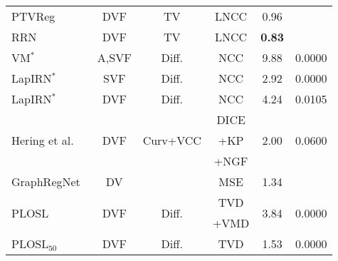 \begin{table}[htp]
\begin{small}
{\begin{tabular}{lccccc}
				PTVReg~\cite{vishnevskiy2017isotropic}                    & DVF                  & TV                                    & LNCC    & 0.96\resTS                  & \textemdash             \\
				RRN~\cite{he2021recursive}                                & DVF                  & TV                                    & LNCC    & \textbf{0.83}\resTS         & \textemdash             \\
				\midrule
				VM$^\ast$~\cite{balakrishnan2019voxelmorph}               & A,SVF                & Diff.                                 & NCC     & 9.88\resTS                  & 0.0000                  \\
				LapIRN$^\ast$~\cite{mok2020large}                         & SVF                  & Diff.                                 & NCC     & 2.92\resTS                  & 0.0000                  \\
				LapIRN$^\ast$~\cite{mok2020large}                         & DVF                  & Diff.                                 & NCC     & 4.24\resTS                  & 0.0105                  \\
				\multirow{3}{*}{Hering et al. ~\cite{hering2021cnn}}      & \multirow{3}{*}{DVF} & \multirow{3}{*}{Curv+VCC}             & DICE    & \multirow{3}{*}{2.00\resTS} & \multirow{3}{*}{0.0600} \\
				                                                          &                      &                                       & +KP     &                             &                         \\
				                                                          &                      &                                       & +NGF    &                             &                         \\
				GraphRegNet~\cite{hansen2021graphregnet}                  & DV                   & \textemdash                           & MSE     & 1.34\resTS                  & \textemdash             \\
				\multirow{2}{*}{PLOSL~\cite{wang2022PLOSL}}               & \multirow{2}{*}{DVF} & \multirow{2}{*}{Diff.}                & TVD     & \multirow{2}{*}{3.84\resTS} & \multirow{2}{*}{0.0000} \\
				                                                          &                      &                                       & +VMD    &                             &                         \\
				\multirow{2}{*}{$\text{PLOSL}_{50}$~\cite{wang2022PLOSL}} & \multirow{2}{*}{DVF} & \multirow{2}{*}{Diff.}                & TVD     & \multirow{2}{*}{1.53\resTS} & \multirow{2}{*}{0.0000} \\

\end{tabular}}
\end{small}
\end{table}
